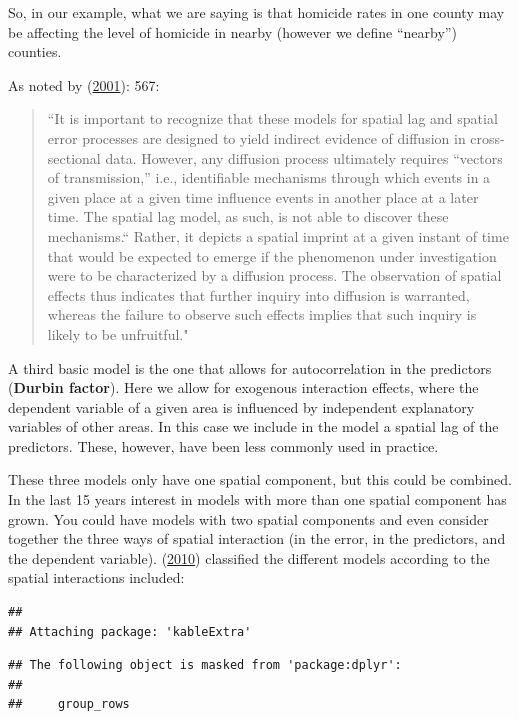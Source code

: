 \documentclass[
  krantz2]{krantz}
\begin{document}
So, in our example, what we are saying is that homicide rates in one county may be affecting the level of homicide in nearby (however we define ``nearby'') counties.

As noted by (\protect\hyperlink{ref-Baller_2001}{2001}): 567:

\begin{quote}
``It is important to recognize that these models for spatial lag and spatial
error processes are designed to yield indirect evidence of diffusion in
cross-sectional data. However, any diffusion process ultimately requires
``vectors of transmission,'' i.e., identifiable mechanisms through which
events in a given place at a given time influence events in another place at
a later time. The spatial lag model, as such, is not able to discover these
mechanisms.`` Rather, it depicts a spatial imprint at a given instant of time
that would be expected to emerge if the phenomenon under investigation
were to be characterized by a diffusion process. The observation of spatial
effects thus indicates that further inquiry into diffusion is warranted,
whereas the failure to observe such effects implies that such inquiry is
likely to be unfruitful."
\end{quote}

A third basic model is the one that allows for autocorrelation in the predictors (\textbf{Durbin factor}). Here we allow for exogenous interaction effects, where the dependent variable of a given area is influenced by independent explanatory variables of other areas. In this case we include in the model a spatial lag of the predictors. These, however, have been less commonly used in practice.

These three models only have one spatial component, but this could be combined. In the last 15 years interest in models with more than one spatial component has grown. You could have models with two spatial components and even consider together the three ways of spatial interaction (in the error, in the predictors, and the dependent variable). (\protect\hyperlink{ref-Elhorst_2010}{2010}) classified the different models according to the spatial interactions included:

\begin{verbatim}
## 
## Attaching package: 'kableExtra'
\end{verbatim}

\begin{verbatim}
## The following object is masked from 'package:dplyr':
## 
##     group_rows
\end{verbatim}
\end{document}
